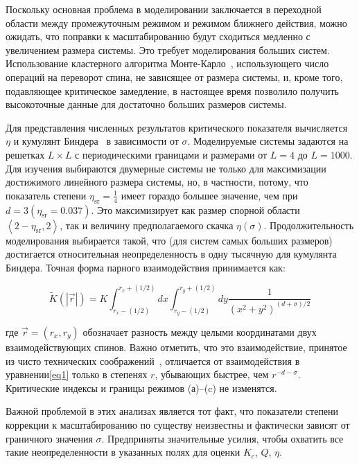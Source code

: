 Поскольку основная проблема в моделировании заключается в переходной области между промежуточным режимом и режимом ближнего действия, можно ожидать, что поправки к масштабированию будут сходиться медленно с увеличением размера системы. Это требует моделирования больших систем. Использование кластерного алгоритма Монте-Карло~\cite{10.1142/S0129183195000265}, использующего число операций на переворот спина, не зависящее от размера системы, и, кроме того, подавляющее критическое замедление, в настоящее время позволило получить высокоточные данные для достаточно больших размеров системы.

Для представления численных результатов критического показателя вычисляется $\eta$ и кумулянт Биндера~\cite{10.1007/BF01293604} в зависимости от $\sigma$. Моделируемые системы задаются на решетках $L\times L$ с периодическими границами и размерами от $L=4$ до $L=1000$. 
Для изучения выбираются двумерные системы не только для максимизации достижимого линейного размера системы, но, в частности, потому, что показатель степени $\eta_{\mathrm{sr}}=\frac{1}{4}$ имеет гораздо большее значение, чем при $d=3\left(\eta_{\mathrm{sr}}=0.037\right)$. Это максимизирует как размер спорной области $\left\langle 2-\eta_{\mathrm{sr}}, 2\right\rangle$, так и величину предполагаемого скачка $\eta(\sigma)$. Продолжительность моделирования выбирается такой, что (для систем самых больших размеров) достигается относительная неопределенность в одну тысячную для кумулянта Биндера. Точная форма парного взаимодействия принимается как:

\begin{equation}
\tilde{K}(|\vec{r}|)=K \int_{r_{x}-(1 / 2)}^{r_{x}+(1 / 2)} d x \int_{r_{y}-(1 / 2)}^{r_{y}+(1 / 2)} d y \frac{1}{\left(x^{2}+y^{2}\right)^{(d+\sigma) / 2}}
\end{equation}

где $\vec r=\left(r_{x}, r_{y}\right)$ обозначает разность между целыми координатами двух взаимодействующих спинов. Важно отметить, что это взаимодействие, принятое из чисто технических соображений~\cite{10.1142/S0129183195000265}, отличается от взаимодействия в уравнении\ref{eq1} только в степенях $r$, убывающих быстрее, чем $r^{-d-\sigma}$. Критические индексы и границы режимов (а)–(c) не изменятся. 

Важной проблемой в этих анализах является тот факт, что показатели степени коррекции к масштабированию по существу неизвестны и фактически зависят от граничного значения $\sigma$. Предприняты значительные усилия, чтобы охватить все такие неопределенности в указанных полях для оценки $K_{c}$, $Q$, $\eta$.

